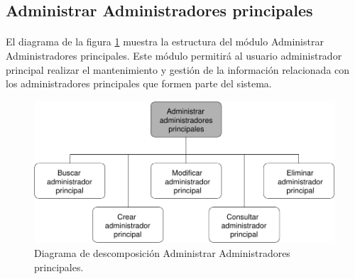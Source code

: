 \subsection{Administrar Administradores principales}

  \paragraph{}El diagrama de la figura
  \ref{diagramaDescomposicionAdministrarAdministradoresPrincipales} muestra la
  estructura del módulo Administrar Administradores principales. Este módulo
  permitirá al usuario administrador principal realizar el mantenimiento y
  gestión de la información relacionada con los administradores principales que
  formen parte del sistema.


  \begin{figure}[!ht]
    \begin{center}
      \includegraphics[]{11.Disenyo_Arquitectonico/11.2.Diagramas_Descomposicion/11.2.2.Modulo_administrador_principal/AdministrarBBDD/AdministrarUsuarios/AdministrarAdministradoresPrincipales/Diagramas/administrar_administradores_principales.pdf}
      \caption{Diagrama de descomposición Administrar Administradores principales.}
      \label{diagramaDescomposicionAdministrarAdministradoresPrincipales}
    \end{center}
  \end{figure}

